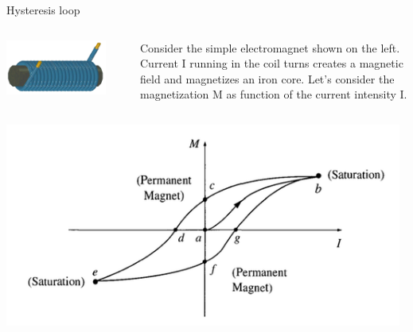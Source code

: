 \begin{frame}{Hysteresis loop}

\begin{columns}
  \begin{column}{0.30\textwidth}
    \begin{center}
       \includegraphics[width=0.85\textwidth]{./images/schematics/simple_electromagnet_01.png}\\
    \end{center}
  \end{column}
  \begin{column}{0.70\textwidth}
   {\small
       Consider the simple electromagnet shown on the left. Current I running in the coil turns
       creates a magnetic field and magnetizes an iron core.
       Let's consider the magnetization M as function of the current intensity I.
   }
  \end{column}
\end{columns}

\begin{center}
   \includegraphics[width=0.98\textwidth]{./images/schematics/hysterisis_curve_01.png}\\
\end{center}

\end{frame}

